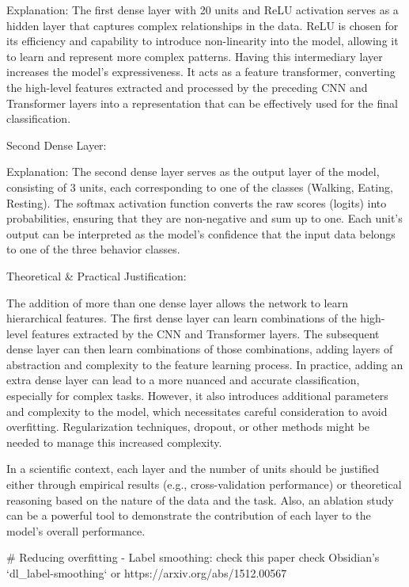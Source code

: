     Explanation: The first dense layer with 20 units and ReLU activation serves as a hidden layer that captures complex relationships in the data. ReLU is chosen for its efficiency and capability to introduce non-linearity into the model, allowing it to learn and represent more complex patterns. Having this intermediary layer increases the model’s expressiveness. It acts as a feature transformer, converting the high-level features extracted and processed by the preceding CNN and Transformer layers into a representation that can be effectively used for the final classification.

Second Dense Layer:

    Explanation: The second dense layer serves as the output layer of the model, consisting of 3 units, each corresponding to one of the classes (Walking, Eating, Resting). The softmax activation function converts the raw scores (logits) into probabilities, ensuring that they are non-negative and sum up to one. Each unit’s output can be interpreted as the model's confidence that the input data belongs to one of the three behavior classes.

Theoretical & Practical Justification:

    The addition of more than one dense layer allows the network to learn hierarchical features. The first dense layer can learn combinations of the high-level features extracted by the CNN and Transformer layers. The subsequent dense layer can then learn combinations of those combinations, adding layers of abstraction and complexity to the feature learning process.
    In practice, adding an extra dense layer can lead to a more nuanced and accurate classification, especially for complex tasks. However, it also introduces additional parameters and complexity to the model, which necessitates careful consideration to avoid overfitting. Regularization techniques, dropout, or other methods might be needed to manage this increased complexity.

In a scientific context, each layer and the number of units should be justified either through empirical results (e.g., cross-validation performance) or theoretical reasoning based on the nature of the data and the task. Also, an ablation study can be a powerful tool to demonstrate the contribution of each layer to the model's overall performance.






# Reducing overfitting
- Label smoothing: check this paper check Obsidian's `dl_label-smoothing` or https://arxiv.org/abs/1512.00567












